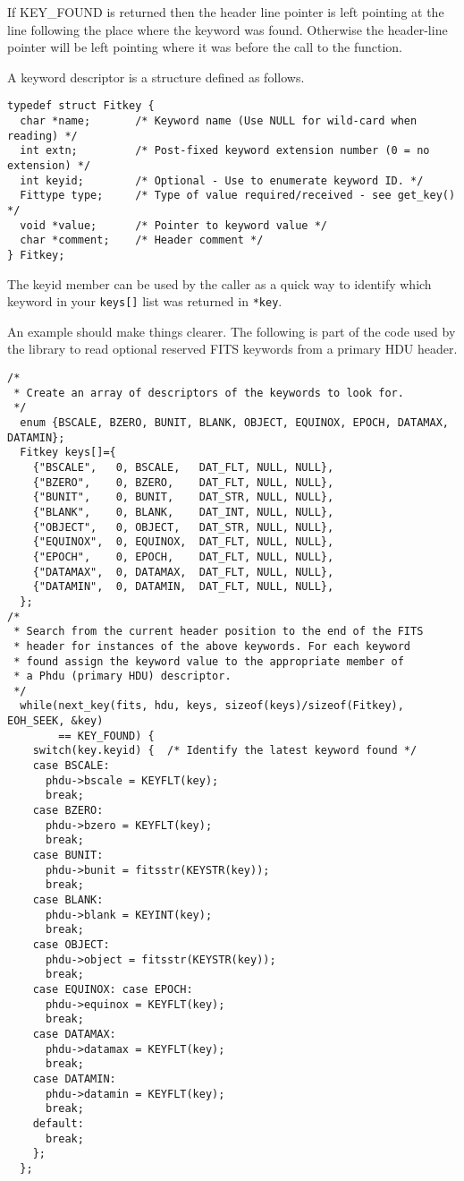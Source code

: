 If KEY\_FOUND is returned then the header line pointer is left pointing
at the line following the place where the keyword was found.
Otherwise the header-line pointer will be left pointing where it was
before the call to the function.

A keyword descriptor is a structure defined as follows.
\label{Fitkey}\begin{verbatim}
typedef struct Fitkey {
  char *name;       /* Keyword name (Use NULL for wild-card when reading) */
  int extn;         /* Post-fixed keyword extension number (0 = no extension) */
  int keyid;        /* Optional - Use to enumerate keyword ID. */
  Fittype type;     /* Type of value required/received - see get_key() */
  void *value;      /* Pointer to keyword value */
  char *comment;    /* Header comment */
} Fitkey;
\end{verbatim}

The keyid member can be used by the caller as a quick way to identify
which keyword in your \verb`keys[]` list was returned in \verb`*key`.

An example should make things clearer. The following is part of the
code used by the library to read optional reserved FITS keywords from
a primary HDU header.

{\small\begin{verbatim}
/*
 * Create an array of descriptors of the keywords to look for.
 */
  enum {BSCALE, BZERO, BUNIT, BLANK, OBJECT, EQUINOX, EPOCH, DATAMAX, DATAMIN};
  Fitkey keys[]={
    {"BSCALE",   0, BSCALE,   DAT_FLT, NULL, NULL},
    {"BZERO",    0, BZERO,    DAT_FLT, NULL, NULL},
    {"BUNIT",    0, BUNIT,    DAT_STR, NULL, NULL},
    {"BLANK",    0, BLANK,    DAT_INT, NULL, NULL},
    {"OBJECT",   0, OBJECT,   DAT_STR, NULL, NULL},
    {"EQUINOX",  0, EQUINOX,  DAT_FLT, NULL, NULL},
    {"EPOCH",    0, EPOCH,    DAT_FLT, NULL, NULL},
    {"DATAMAX",  0, DATAMAX,  DAT_FLT, NULL, NULL},
    {"DATAMIN",  0, DATAMIN,  DAT_FLT, NULL, NULL},
  };
/*
 * Search from the current header position to the end of the FITS
 * header for instances of the above keywords. For each keyword
 * found assign the keyword value to the appropriate member of
 * a Phdu (primary HDU) descriptor.
 */
  while(next_key(fits, hdu, keys, sizeof(keys)/sizeof(Fitkey), EOH_SEEK, &key)
        == KEY_FOUND) {
    switch(key.keyid) {  /* Identify the latest keyword found */
    case BSCALE:
      phdu->bscale = KEYFLT(key);
      break;
    case BZERO:
      phdu->bzero = KEYFLT(key);
      break;
    case BUNIT:
      phdu->bunit = fitsstr(KEYSTR(key));
      break;
    case BLANK:
      phdu->blank = KEYINT(key);
      break;
    case OBJECT:
      phdu->object = fitsstr(KEYSTR(key));
      break;
    case EQUINOX: case EPOCH:
      phdu->equinox = KEYFLT(key);
      break;
    case DATAMAX:
      phdu->datamax = KEYFLT(key);
      break;
    case DATAMIN:
      phdu->datamin = KEYFLT(key);
      break;
    default:
      break;
    };
  };
\end{verbatim}}

